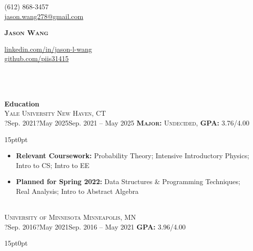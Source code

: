 \documentclass[letterpaper,11pt]{article}
\let\oldl\Large
\renewcommand{\Large}[1]{{\color{yale}\oldl{#1}}}
\let\oldsc\textsc{}
\renewcommand{\textsc}[1]{\normalsize\oldsc{#1}}
\newcommand{\years}[2]{\footnotesize \ifx?#1?#2\else#1 -- #2\fi}
\newenvironment{edmodule}[5]{
\textsc{#1} \hfill \textsc{\footnotesize#4}\\
\years{#2}{#3} \hfill \textsc{\footnotesize#5}
\footnotesize \begin{adjustwidth}{15pt}{0pt}
}{
\end{adjustwidth} 
\normalsize \null\vspace{-11pt}
}
\newcommand{\category}[1]{\textbf{\Large{#1}}\vspace{-5pt}\\ \setstretch{1.35}\null\vspace{-5pt}\newline}
\begin{document}
\begin{center}
\begin{minipage}[t]{.3\textwidth}
\vspace{0pt}
\footnotesize
{} (612) 868-3457\\
 \href{mailto:jason.wang278@gmail.com}{\underline{jason.wang278@gmail.com}}\\%
\end{minipage}
\begin{minipage}[t]{.35\textwidth}
\vspace{0pt}
\centering
\textbf{\color{yale}\Huge \scshape Jason Wang} 
\end{minipage}
\begin{minipage}[t]{.3\textwidth}
\vspace{0pt}
\footnotesize\begin{flushright}
\href{https://linkedin.com/in/jason-l-wang}{\underline{linkedin.com/in/jason-l-wang}} \faLinkedin\\
\href{https://github.com/piis31415}{\underline{github.com/piis31415}} \faGithub\end{flushright}
\end{minipage}
\end{center}\vspace{-10pt}\\
\hrulefill\vspace{-10pt}\\
\null\hrulefill\vspace{5pt}\\
\category{Education}
\begin{edmodule}{Yale University}{Sep. 2021}{May 2025}{New Haven, CT}{\textbf{Major:} Undecided, \textbf{GPA:} 3.76/4.00}
\end{edmodule}\vspace{-25pt}\footnotesize
\begin{itemize}
    \item \textbf{Relevant Coursework:} Probability Theory; Intensive Introductory Physics; Intro to CS; Intro to EE
    \item \textbf{Planned for Spring 2022:} Data Structures \& Programming Techniques; Real Analysis; Intro to Abstract Algebra 
\end{itemize}\\
\begin{edmodule}{University of Minnesota}{Sep. 2016}{May 2021}{Minneapolis, MN}{
\textbf{GPA:} 3.96/4.00}
\end{edmodule}\vspace{-25pt}
\end{document}
